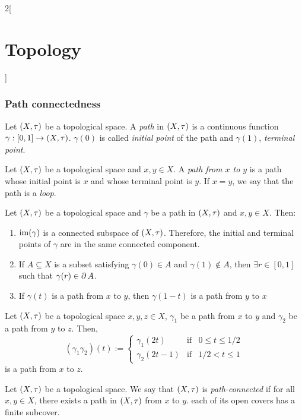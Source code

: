 \documentclass[../../../main.tex]{subfiles}
\begin{document}
\begin{multicols}{2}[\section{Topology}]
  \subsubsection{Path connectedness}
  \begin{definition}
    Let $(X,\tau)$ be a topological space. A \emph{path} in $(X,\tau)$ is a continuous function $\gamma:[0,1]\rightarrow (X,\tau)$. $\gamma(0)$ is called \emph{initial point} of the path and $\gamma(1)$, \emph{terminal point}.
  \end{definition}
  \begin{definition}
    Let $(X,\tau)$ be a topological space and $x,y\in X$. A \emph{path from $x$ to $y$} is a path whose initial point is $x$ and whose terminal point is $y$. If $x=y$, we say that the path is a \emph{loop}.
  \end{definition}
  \begin{prop}
    Let $(X,\tau)$ be a topological space and $\gamma$ be a path in $(X,\tau)$ and $x,y\in X$. Then:
    \begin{enumerate}
      \item $\operatorname{im}(\gamma)$ is a connected subspace of $(X,\tau)$. Therefore, the initial and terminal points of $\gamma$ are in the same connected component.
      \item If $A\subseteq X$ is a subset satisfying $\gamma(0)\in A$ and $\gamma(1)\notin A$, then $\exists r\in[0,1]$ such that $\gamma(r)\in\operatorname{\partial} A$.
      \item If $\gamma(t)$ is a path from $x$ to $y$, then  $\gamma(1-t)$ is a path from $y$ to $x$
    \end{enumerate}
  \end{prop}
  \begin{prop}
    Let $(X,\tau)$ be a topological space $x,y,z\in X$, $\gamma_1$ be a path from $x$ to $y$ and $\gamma_2$ be a path from $y$ to $z$. Then, $$(\gamma_1\gamma_2)(t):=\left\{
      \begin{array}{lcc}
        \gamma_1(2t)   & \text{if} & 0\leq t\leq 1/2 \\
        \gamma_2(2t-1) & \text{if} & 1/2 <t\leq 1
      \end{array}
      \right.$$
    is a path from $x$ to $z$.
  \end{prop}
  \begin{definition}
    Let $(X,\tau)$ be a topological space. We say that $(X,\tau)$ is \emph{path-connected} if for all $x,y\in X$, there exists a path in $(X,\tau)$ from $x$ to $y$. each of its open covers has a finite subcover.

\end{definition}
\end{multicols}
\end{document}
